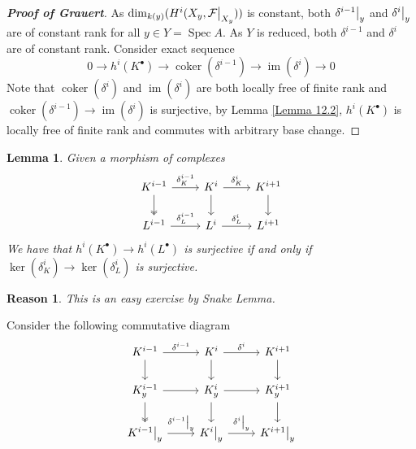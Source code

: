 \documentclass{ctexart}
\newtheorem{lemma}{Lemma}[section]
\newtheorem{reason}{Reason}[section]
\newcommand{\im}{\operatorname{im}}
\newcommand{\coker}{\operatorname{coker}}
\newcommand{\spec}{\operatorname{Spec}}
\begin{document}
\begin{proof}[\textbf{\emph{Proof of Grauert}}]
    As $\dim_{k(y)}(H^{i}(X_{y}, \mathcal{F}\big{|}_{X_{y}}))$ is constant, both $\delta^{i - 1}\big{|}_{y}$ and $\delta^{i}\big{|}_{y}$ are of constant rank for all $y\in Y = \spec A$.
    As $Y$ is reduced, both $\delta^{i - 1}$ and $\delta^{i}$ are of constant rank.
    Consider exact sequence
    \begin{equation*}
        0 \longrightarrow h^{i}(K^{\bullet}) \longrightarrow \coker(\delta^{i - 1}) \longrightarrow \im(\delta^{i}) \longrightarrow 0
    \end{equation*}
    Note that $\coker(\delta^{i})$ and $\im(\delta^{i})$ are both locally free of finite rank and $\coker(\delta^{i - 1}) \longrightarrow \im(\delta^{i})$ is surjective, 
    by Lemma \ref{Lemma 12.2}, $h^{i}(K^{\bullet})$ is locally free of finite rank and commutes with arbitrary base change. 
\end{proof}
\begin{lemma}
    Given a morphism of complexes 
    \begin{equation*}
        \begin{tikzcd}
            K^{i - 1} \arrow[r, "\delta_{K}^{i - 1}"] \arrow[d, twoheadrightarrow] &
            K^{i} \arrow[r, "\delta_{K}^{i}"] \arrow[d] &
            K^{i + 1} \arrow[d] \\
            L^{i - 1} \arrow[r, "\delta_{L}^{i - 1}"] &
            L^{i} \arrow[r, "\delta_{L}^{i}"] &
            L^{i + 1}
        \end{tikzcd}
    \end{equation*}
    We have that $h^{i}(K^{\bullet}) \longrightarrow h^{i}(L^{\bullet})$ is surjective if and only if $\ker(\delta_{K}^{i}) \longrightarrow \ker(\delta_{L}^{i})$ is surjective.
    \label{Lemma 12.4}
\end{lemma}
\begin{reason}
    This is an easy exercise by Snake Lemma.
\end{reason}
Consider the following commutative diagram
\begin{equation*}
    \begin{tikzcd}
        K^{i - 1} \arrow[r, "\delta^{i - 1}"] \arrow[d] &
        K^{i} \arrow[r, "\delta^{i}"] \arrow[d] &
        K^{i + 1} \arrow[d] \\
        K_{y}^{i - 1} \arrow[r] \arrow[d, twoheadrightarrow] &
        K_{y}^{i} \arrow[r] \arrow[d] &
        K_{y}^{i + 1} \arrow[d] \\
        K^{i - 1}\big{|}_{y} \arrow[r, "\delta^{i - 1}\big{|}_{y}"] &
        K^{i}\big{|}_{y} \arrow[r, "\delta^{i}\big{|}_{y}"] &
        K^{i + 1}\big{|}_{y}
    \end{tikzcd}
\end{equation*}
\end{document}
